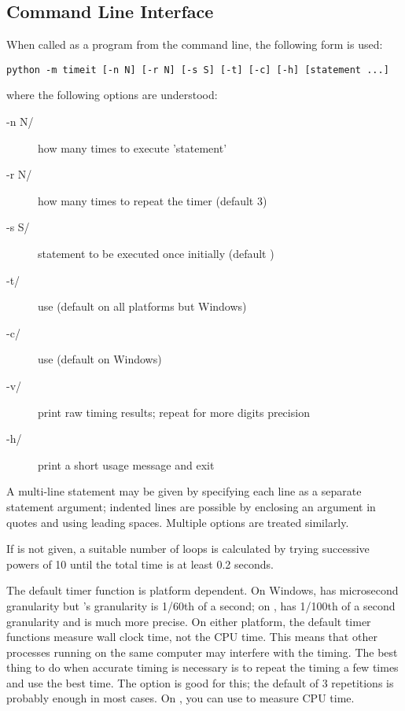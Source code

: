 \subsection{Command Line Interface}

When called as a program from the command line, the following form is used:

\begin{verbatim}
python -m timeit [-n N] [-r N] [-s S] [-t] [-c] [-h] [statement ...]
\end{verbatim}

where the following options are understood:

\begin{description}
\item[-n N/] how many times to execute 'statement'
\item[-r N/] how many times to repeat the timer (default 3)
\item[-s S/] statement to be executed once initially (default
)
\item[-t/] use 
(default on all platforms but Windows)
\item[-c/] use  (default on Windows)
\item[-v/] print raw timing results; repeat for more digits
precision
\item[-h/] print a short usage message and exit
\end{description}

A multi-line statement may be given by specifying each line as a
separate statement argument; indented lines are possible by enclosing
an argument in quotes and using leading spaces.  Multiple
 options are treated similarly.

If  is not given, a suitable number of loops is
calculated by trying successive powers of 10 until the total time is
at least 0.2 seconds.

The default timer function is platform dependent.  On Windows,
 has microsecond granularity but
's granularity is 1/60th of a second; on \UNIX,
 has 1/100th of a second granularity and
 is much more precise.  On either platform, the
default timer functions measure wall clock time, not the CPU time.
This means that other processes running on the same computer may
interfere with the timing.  The best thing to do when accurate timing
is necessary is to repeat the timing a few times and use the best
time.  The  option is good for this; the default of 3
repetitions is probably enough in most cases.  On \UNIX, you can use
 to measure CPU time.

